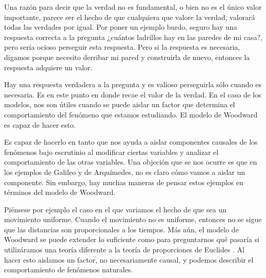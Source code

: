 Una razón para decir que la verdad no es fundamental, o bien no es el único valor importante, parece ser el hecho de que cualquiera que valore la verdad, valorará todas las verdades por igual. Por poner un ejemplo burdo, seguro hay una respuesta correcta a la pregunta ¿cuántos ladrillos hay en las paredes de mi casa?, pero sería ocioso perseguir esta respuesta. Pero si la respuesta es necesaria, digamos porque necesito derribar mi pared y construirla de nuevo, entonces la respuesta adquiere un valor.

Hay una respuesta verdadera a la pregunta y es valioso perseguirla sólo cuando es necesaria. Es en este punto en donde recae el valor de la verdad. En el caso de los modelos, nos son útiles cuando se puede aislar un factor que determina el comportamiento del fenómeno que estamos estudiando. El modelo de Woodward es capaz de hacer esto.

Es capaz de hacerlo en tanto que nos ayuda a aislar componentes causales de los fenómenos bajo escrutinio al modificar ciertas variables y analizar el comportamiento de las otras variables. Una objeción que se nos ocurre es que en los ejemplos de Galileo y de Arquímedes, no es claro cómo vamos a aislar un componente. Sin embargo, hay muchas maneras de pensar estos ejemplos en términos del modelo de Woodward.

Piénsese por ejemplo el caso en el que variamos el hecho de que sea un movimiento uniforme. Cuando el movimiento no es uniforme, entonces no se sigue que las distancias son proporcionales a los tiempos. Más aún, el modelo de Woodward se puede extender lo suficiente como para preguntarnos qué pasaría si utilizáramos una teoría diferente a la teoría de proporciones de Euclides \cite{Woodward2018}. Al hacer esto aislamos un factor, no necesariamente causal, y podemos describir el comportamiento de fenómenos naturales.

